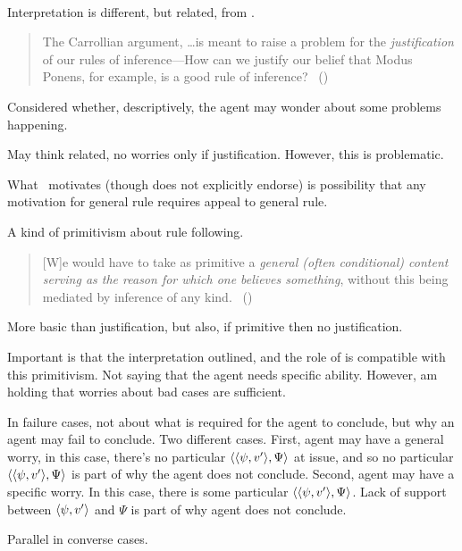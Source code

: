\paragraph{\textcite{Boghossian:2008vf}}

\begin{note}
  Interpretation is different, but related, from \textcite{Boghossian:2008vf}.

  \begin{quote}
    The Carrollian argument, \dots is meant to raise a problem for the \emph{justification} of our rules of inference---How can we justify our belief that Modus Ponens, for example, is a good rule of inference?\newline
    \mbox{ }\hfill\mbox{(\citeyear[493]{Boghossian:2008vf})}
  \end{quote}

  Considered whether, descriptively, the agent may wonder about some problems happening.

  May think related, no worries only if justification.
  However, this is problematic.

  What~\textcite{Boghossian:2008vf} motivates (though does not explicitly endorse) is possibility that any motivation for general rule requires appeal to general rule.

  A kind of primitivism about rule following.
  \begin{quote}
    [W]e would have to take as primitive a \emph{general (often conditional) content serving as the reason for which one believes something}, without this being mediated by inference of any kind.%
    \mbox{ }\hfill\mbox{(\citeyear[500]{Boghossian:2008vf})}
  \end{quote}

  More basic than justification, but also, if primitive then no justification.

  Important is that the interpretation outlined, and the role of \qzS{} is compatible with this primitivism.
  Not saying that the agent needs specific ability.
  However, am holding that worries about bad cases are sufficient.

  In failure cases, not about what is required for the agent to conclude, but why an agent may fail to conclude.
  Two different cases.
  First, agent may have a general worry, in this case, there's no particular \(\langle \langle \psi, v' \rangle, \Psi \rangle\) at issue, and so no particular \(\langle \langle \psi, v' \rangle, \Psi \rangle\) is part of why the agent does not conclude.
  Second, agent may have a specific worry.
  In this case, there is some particular \(\langle \langle \psi, v' \rangle, \Psi \rangle\).
  Lack of support between \(\langle \psi, v' \rangle\) and \(\Psi\) is part of why agent does not conclude.

  Parallel in converse cases.
\end{note}

